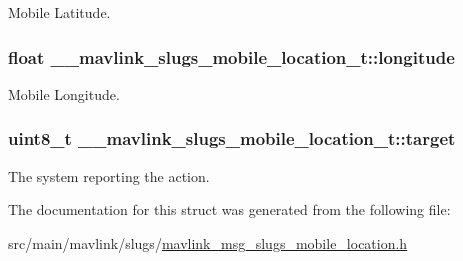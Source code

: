 Mobile Latitude. 

\hypertarget{struct____mavlink__slugs__mobile__location__t_aa5183cef5c8d7755018562561ad0c677}{
\subsubsection[{longitude}]{\setlength{\rightskip}{0pt plus 5cm}float \+\_\+\+\_\+mavlink\+\_\+slugs\+\_\+mobile\+\_\+location\+\_\+t\+::longitude}}\label{struct____mavlink__slugs__mobile__location__t_aa5183cef5c8d7755018562561ad0c677}


Mobile Longitude. 

\hypertarget{struct____mavlink__slugs__mobile__location__t_ad256cecd775dec71273242e31a7de962}{
\subsubsection[{target}]{\setlength{\rightskip}{0pt plus 5cm}uint8\+\_\+t \+\_\+\+\_\+mavlink\+\_\+slugs\+\_\+mobile\+\_\+location\+\_\+t\+::target}}\label{struct____mavlink__slugs__mobile__location__t_ad256cecd775dec71273242e31a7de962}


The system reporting the action. 



The documentation for this struct was generated from the following file\+:\begin{DoxyCompactItemize}
\item 
src/main/mavlink/slugs/\hyperlink{mavlink__msg__slugs__mobile__location_8h}{mavlink\+\_\+msg\+\_\+slugs\+\_\+mobile\+\_\+location.\+h}\end{DoxyCompactItemize}
